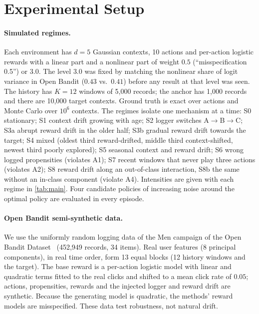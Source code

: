 \section{Experimental Setup}\label{sec:setup}

\paragraph{Simulated regimes.}
Each environment has $d=5$ Gaussian contexts, 10 actions and per-action logistic rewards
with a linear part and a nonlinear part of weight $0.5$ (``misspecification 0.5'') or $3.0$.
The level $3.0$ was fixed by matching the nonlinear share of logit variance in Open Bandit
($0.43$ vs.\ $0.41$) before any result at that level was seen. The history has $K=12$ windows
of 5{,}000 records; the anchor has 1{,}000 records and there are 10{,}000 target
contexts. Ground truth is exact over actions and Monte Carlo over $10^6$ contexts.
The regimes isolate one mechanism at a time:
S0 stationary;
S1 context drift growing with age;
S2 logger switches A$\to$B$\to$C;
S3a abrupt reward drift in the older half;
S3b gradual reward drift towards the target;
S4 mixed (oldest third reward-drifted, middle third context-shifted, newest third poorly
explored);
S5 seasonal context and reward drift;
S6 wrong logged propensities (violates A1);
S7 recent windows that never play three actions (violates A2);
S8 reward drift along an out-of-class interaction, S8b the same without an in-class component
(violate A4). Intensities are given with each regime in \cref{tab:main}. Four candidate
policies of increasing noise around the optimal policy are evaluated in every episode.

\paragraph{Open Bandit semi-synthetic data.}
We use the uniformly random logging data of the Men campaign of the Open Bandit
Dataset~\cite{saito2021open} (452{,}949 records, 34 items). Real user features (8 principal
components), in real time order, form 13 equal blocks (12 history windows and the target). The base reward is a
per-action logistic model with linear and quadratic terms fitted to the real clicks and
shifted to a mean click rate of $0.05$; actions, propensities, rewards and the injected
logger and reward drift are synthetic. Because the generating model is quadratic, the
methods' reward models are misspecified. These data test robustness, not natural drift.


